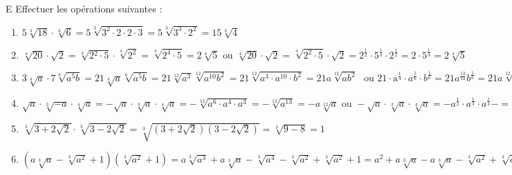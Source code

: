 \begin{solution}E
Effectuer les opérations suivantes :
\begin{enumerate}
\item $5\sqrt[3]{18}\cdot \sqrt[3]{6}=5\sqrt[3]{{{3}^{2}}\cdot 2\cdot 2\cdot 3}=5\sqrt[3]{{{3}^{3}}\cdot {{2}^{2}}}=15\sqrt[3]{4}$
\item $\sqrt[4]{20}\cdot \sqrt{2}=\sqrt[4]{2{}^{2}\cdot 5}\cdot \sqrt[4]{{{2}^{2}}}=\sqrt[4]{{{2}^{4}}\cdot 5}=2\sqrt[4]{5}\text{   ou   }\sqrt[4]{20}\cdot \sqrt{2}=\sqrt[4]{{{2}^{2}}\cdot 5}\cdot \sqrt{2}={{2}^{\frac{1}{2}}}\cdot {{5}^{\frac{1}{4}}}\cdot {{2}^{\frac{1}{2}}}=2\cdot {{5}^{\frac{1}{4}}}=2\sqrt[4]{5}$
\item $3\sqrt[4]{a}\cdot 7\sqrt[6]{{{a}^{5}}b}=21\sqrt[4]{a}\sqrt[6]{{{a}^{5}}b}=21\sqrt[12]{{{a}^{3}}}\sqrt[12]{{{a}^{10}}{{b}^{2}}}=21\sqrt[12]{{{a}^{3}}\cdot {{a}^{10}}\cdot {{b}^{2}}}=21a\sqrt[12]{a{{b}^{2}}}\text{ }\text{ou   21}\cdot {{\text{a}}^{\frac{\text{1}}{\text{4}}}}\cdot a{}^{\frac{5}{6}}\cdot {{b}^{\frac{1}{6}}}=21{{a}^{\frac{13}{12}}}{{b}^{\frac{1}{6}}}=21a\sqrt[12]{a{{b}^{2}}}$
\item $\sqrt{a}\cdot \sqrt[3]{-a}\cdot \sqrt[4]{a}=-\sqrt{a}\cdot \sqrt[3]{a}\cdot \sqrt[4]{a}=-\sqrt[12]{{{a}^{6}}\cdot {{a}^{4}}\cdot {{a}^{3}}}=-\sqrt[12]{{{a}^{13}}}=-a\sqrt[12]{a} \mbox{ ou }-\sqrt{a}\cdot \sqrt[3]{a}\cdot \sqrt[4]{a}=-{{a}^{\frac{1}{2}}}\cdot {{a}^{\frac{1}{3}}}\cdot {{a}^{\frac{1}{4}}}-=-{{a}^{\frac{13}{12}}}=-a\sqrt[12]{a}$
\item $\sqrt[3]{3+2\sqrt{2}}\cdot \sqrt[3]{3-2\sqrt{2}}=\sqrt[3]{\left( 3+2\sqrt{2} \right)\left( 3-2\sqrt{2} \right)}=\sqrt[3]{9-8}=1$
\item $\left( a\sqrt[3]{a}-\sqrt[3]{{{a}^{2}}}+1 \right)\left( \sqrt[3]{{{a}^{2}}}+1 \right)=a\sqrt[3]{{{a}^{3}}}+a\sqrt[3]{a}-\sqrt[3]{{{a}^{4}}}-\sqrt[3]{{{a}^{2}}}+\sqrt[3]{{{a}^{2}}}+1 ={{a}^{2}}+a\sqrt[3]{a}-a\sqrt[3]{a}-\sqrt[3]{{{a}^{2}}}+\sqrt[3]{{{a}^{2}}}+1={{a}^{2}}+1$
\end{enumerate}
\end{solution}


